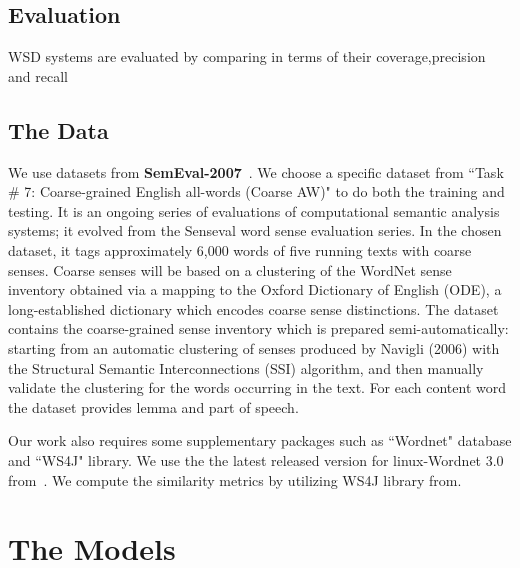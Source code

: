 \documentclass[11pt,letterpaper]{article}
\newcommand{\blue}[1]{\textcolor{RoyalBlue}{#1}}
\newcommand{\instructions}[1]{\blue{\textit{#1}}}
\begin{document}
\subsection{Evaluation}
WSD systems are evaluated by comparing in terms of their coverage,precision and recall  
\subsection{The Data}
\label{sec:data}
We use datasets from \textbf{SemEval-2007}~\cite{semeval}. We choose a specific dataset from ``Task \# 7: Coarse-grained English all-words (Coarse AW)" to do both the training and testing. It is an ongoing series of evaluations of computational semantic analysis systems; it evolved from the Senseval word sense evaluation series. In the chosen dataset, it tags approximately 6,000 words of five running texts with coarse senses. Coarse senses will be based on a clustering of the WordNet sense inventory obtained via a mapping to the Oxford Dictionary of English (ODE), a long-established dictionary which encodes coarse sense distinctions. The dataset contains the coarse-grained sense inventory which is prepared semi-automatically: starting from an automatic clustering of senses produced by Navigli (2006) with the Structural Semantic Interconnections (SSI) algorithm, and then manually validate the clustering for the words occurring in the text. For each content word the dataset provides lemma and part of speech.

Our work also requires some supplementary packages such as ``Wordnet" database and ``WS4J" library. We use the the latest released version for linux-Wordnet 3.0 from~\cite{wordneturl}. We compute the similarity metrics by utilizing WS4J library from\cite{WS4Jurl}.

\section{The Models}
\label{sec:models}
\end{document}
